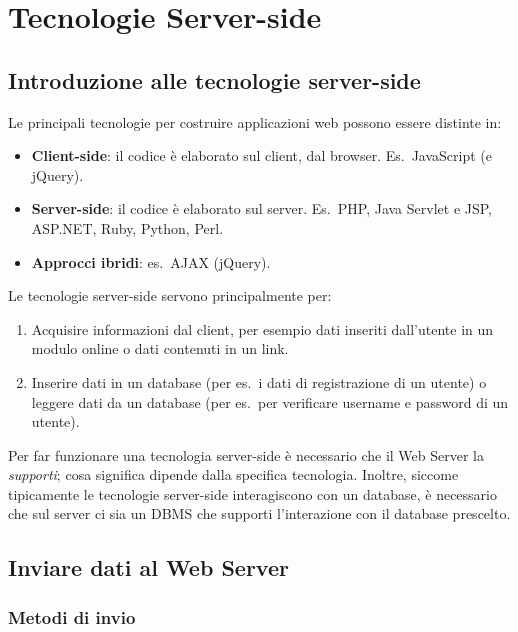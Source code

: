 \chapter{Tecnologie Server-side}

\section{Introduzione alle tecnologie server-side}

Le principali tecnologie per costruire applicazioni web possono essere distinte in:

\begin{itemize}
    \item \textbf{Client-side}: il codice è elaborato sul client, dal browser. Es.\ JavaScript (e jQuery).
    \item \textbf{Server-side}: il codice è elaborato sul server. Es.\ PHP, Java Servlet e JSP, ASP.NET, Ruby, Python, Perl.
    \item \textbf{Approcci ibridi}: es.\ AJAX (jQuery).
\end{itemize}

Le tecnologie server-side servono principalmente per:

\begin{enumerate}
    \item Acquisire informazioni dal client, per esempio dati inseriti dall'utente in un modulo online o dati contenuti in un link.
    \item Inserire dati in un database (per es.\ i dati di registrazione di un utente) o leggere dati da un database (per es.\ per verificare username e password di un utente).
\end{enumerate}

Per far funzionare una tecnologia server-side è necessario che il Web Server la \emph{supporti}; cosa significa dipende dalla specifica tecnologia. Inoltre, siccome tipicamente le tecnologie server-side interagiscono con un database, è necessario che sul server ci sia un DBMS che supporti l'interazione con il database prescelto.

\section{Inviare dati al Web Server}

\subsection{Metodi di invio}

